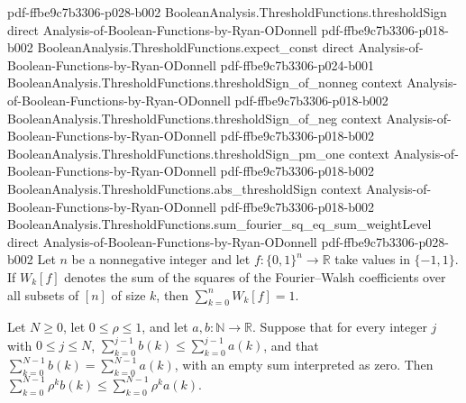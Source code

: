 \begin{lemma}
  {pdf-ffbe9c7b3306-p028-b002}
\proofstep
  {BooleanAnalysis.ThresholdFunctions.thresholdSign}
  {direct}
  {Analysis-of-Boolean-Functions-by-Ryan-ODonnell}
  {pdf-ffbe9c7b3306-p018-b002}
\proofstep
  {BooleanAnalysis.ThresholdFunctions.expect_const}
  {direct}
  {Analysis-of-Boolean-Functions-by-Ryan-ODonnell}
  {pdf-ffbe9c7b3306-p024-b001}
\proofstep
  {BooleanAnalysis.ThresholdFunctions.thresholdSign_of_nonneg}
  {context}
  {Analysis-of-Boolean-Functions-by-Ryan-ODonnell}
  {pdf-ffbe9c7b3306-p018-b002}
\proofstep
  {BooleanAnalysis.ThresholdFunctions.thresholdSign_of_neg}
  {context}
  {Analysis-of-Boolean-Functions-by-Ryan-ODonnell}
  {pdf-ffbe9c7b3306-p018-b002}
\proofstep
  {BooleanAnalysis.ThresholdFunctions.thresholdSign_pm_one}
  {context}
  {Analysis-of-Boolean-Functions-by-Ryan-ODonnell}
  {pdf-ffbe9c7b3306-p018-b002}
\proofstep
  {BooleanAnalysis.ThresholdFunctions.abs_thresholdSign}
  {context}
  {Analysis-of-Boolean-Functions-by-Ryan-ODonnell}
  {pdf-ffbe9c7b3306-p018-b002}
\proofstep
  {BooleanAnalysis.ThresholdFunctions.sum_fourier_sq_eq_sum_weightLevel}
  {direct}
  {Analysis-of-Boolean-Functions-by-Ryan-ODonnell}
  {pdf-ffbe9c7b3306-p028-b002}
Let $n$ be a nonnegative integer and let $f:\{0,1\}^n\to\mathbb R$ take values in
$\{-1,1\}$. If $W_k[f]$ denotes the sum of the squares of the Fourier--Walsh
coefficients over all subsets of $[n]$ of size $k$, then $\sum_{k=0}^{n} W_k[f]=1$.
\end{lemma}

\begin{lemma}
\leanok
{}
Let $N\ge 0$, let $0\le\rho\le1$, and let $a,b:\mathbb N\to\mathbb R$. Suppose that for
every integer $j$ with $0\le j\le N$, $\sum_{k=0}^{j-1}b(k)\le\sum_{k=0}^{j-1}a(k)$, and
that $\sum_{k=0}^{N-1}b(k)=\sum_{k=0}^{N-1}a(k)$, with an empty sum interpreted as zero.
Then $\sum_{k=0}^{N-1}\rho^k b(k)\le\sum_{k=0}^{N-1}\rho^k a(k)$.
\end{lemma}

